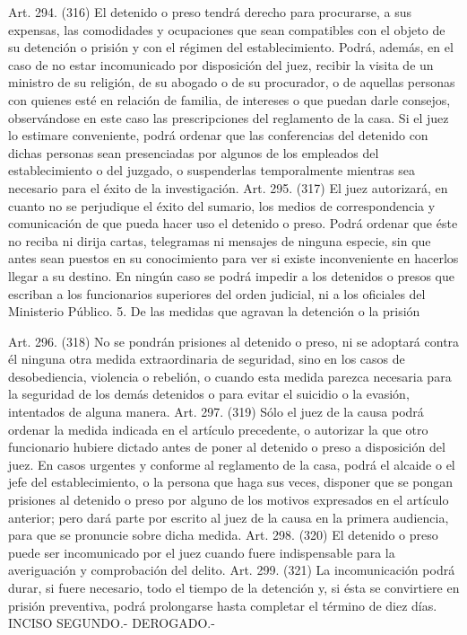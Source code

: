     Art. 294. (316) El detenido o preso tendrá derecho para procurarse, a sus expensas, las comodidades y ocupaciones que sean compatibles con el objeto de su detención o prisión y con el régimen del establecimiento.
    Podrá, además, en el caso de no estar incomunicado por disposición del juez, recibir la visita de un ministro de su religión, de su abogado o de su procurador, o de aquellas personas con quienes esté en relación de familia, de intereses o que puedan darle consejos, observándose en este caso las prescripciones del reglamento de la casa. Si el juez lo estimare conveniente, podrá ordenar que las conferencias del detenido con dichas personas sean presenciadas por algunos de los empleados del establecimiento o del juzgado, o suspenderlas temporalmente mientras sea necesario para el éxito de la investigación.
    Art. 295. (317) El juez autorizará, en cuanto no se perjudique el éxito del sumario, los medios de correspondencia y comunicación de que pueda hacer uso el detenido o preso. Podrá ordenar que éste no reciba ni dirija cartas, telegramas ni mensajes de ninguna especie, sin que antes sean puestos en su conocimiento para ver si existe inconveniente en hacerlos llegar a su destino. En ningún caso se podrá impedir a los detenidos o presos que escriban a los funcionarios superiores del orden judicial, ni a los oficiales del Ministerio Público.
    5. De las medidas que agravan la detención o la prisión

    Art. 296. (318) No se pondrán prisiones al detenido o preso, ni se adoptará contra él ninguna otra medida extraordinaria de seguridad, sino en los casos de desobediencia, violencia o rebelión, o cuando esta medida parezca necesaria para la seguridad de los demás detenidos o para evitar el suicidio o la evasión, intentados de alguna manera.
    Art. 297. (319) Sólo el juez de la causa podrá ordenar la medida indicada en el artículo precedente, o autorizar la que otro funcionario hubiere dictado antes de poner al detenido o preso a disposición del juez.
    En casos urgentes y conforme al reglamento de la casa, podrá el alcaide o el jefe del establecimiento, o la persona que haga sus veces, disponer que se pongan prisiones al detenido o preso por alguno de los motivos expresados en el artículo anterior; pero dará parte por escrito al juez de la causa en la primera audiencia, para que se pronuncie sobre dicha medida.
    Art. 298. (320) El detenido o preso puede ser incomunicado por el juez cuando fuere indispensable para la averiguación y comprobación del delito.
    Art. 299. (321) La incomunicación podrá durar, si fuere necesario, todo el tiempo de la detención y, si ésta se convirtiere en prisión preventiva, podrá prolongarse hasta completar el término de diez días.
    INCISO SEGUNDO.- DEROGADO.-

